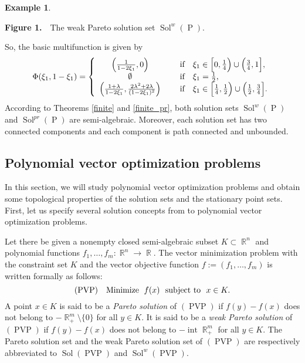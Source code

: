 \documentclass[]{interact}
\theoremstyle{plain}%
\theoremstyle{definition}
\newtheorem{example}{Example}[section]
\DeclareMathOperator{\Sol}{Sol}
\DeclareMathOperator{\PVP}{PVP}
\DeclareMathOperator{\Po}{P}
\DeclareMathOperator{\R}{\mathbb{R}}
\DeclareMathOperator{\inte}{int}
\begin{document}
\begin{example}
\begin{center}
		{\textbf{Figure 1.}\ \, The weak Pareto solution set $\Sol^w(\Po)$.}
	\end{center}
	So, the basic multifunction is given by
	$$\Phi(\xi_1,1-\xi_1)=\left\{\begin{array}{cl}
	\left( \frac{1}{1-2\xi_1},0\right) & \quad \hbox{ if } \ \ \xi_1\in \Big[0,\frac{1}{4}\Big)\cup \Big(\frac{3}{4},1\Big],  \\
	\emptyset & \quad \hbox{ if } \ \ \xi_1=\frac{1}{2}, \\
	\left( \frac{1+\lambda}{1-2\xi_1},\frac{2\lambda^2+2\lambda}{(1-2\xi_1)^2}\right) &  \quad \hbox{ if } \ \ \xi_1\in \Big[\frac{1}{4},\frac{1}{2}\Big)\cup \Big(\frac{1}{2},\frac{3}{4}\Big].  \\
	\end{array}\right.$$
	According to Theorems \ref{finite} and \ref{finite_pr}, both solution sets $\Sol^w(\Po)$
	and $\Sol^{{pr}}(\Po)$ are semi-algebraic. Moreover, each
	solution set has two connected components and each component is path connected and unbounded.
\end{example}

\subsection{Polynomial vector optimization problems}
In this section, we will study polynomial 
vector optimization problems and obtain some topological properties of the solution sets and the stationary point sets.
First, let us specify several solution concepts from \cite{Jahn2011} to polynomial vector
optimization problems.

Let there be given a nonempty closed semi-algebraic subset  $K\subset\R^n$ and polynomial functions $f_1,\dots,f_m:\R^n\to\R$. The vector minimization problem with the constraint set $K$ and the vector objective function $f:=(f_1,\dots,f_m)$ is written formally as follows:
\begin{equation*}\label{VOP} (\PVP)\quad {\rm Minimize}\ \; f(x)\ \ {\rm subject \ to}\ \  x\in K.
\end{equation*}
A point $x\in K$ is said to be  a \textit{Pareto solution} of $(\PVP)$ if  $f(y)-f(x)$ does not belong to $-\R^m_+\setminus\{0\}$
for all $y\in K$. It
is said to be  a {\it weak Pareto solution} of $(\PVP)$ if  $f(y)-f(x)$ does not belong to $-\inte\R^m_+$ for all $y\in K$. The Pareto solution set and the weak Pareto solution set of
$(\PVP)$ are respectively abbreviated to $\Sol(\PVP)$ and $\Sol^w(\PVP)$.
\end{document}
